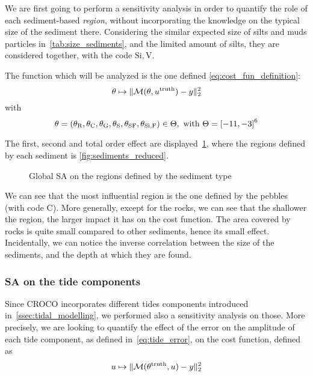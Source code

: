 \documentclass[../../Main_ManuscritThese.tex]{subfiles}
\newcommand{\CROCO}{CROCO}
\newcommand{\zob}{z_b}
\newcommand\imgpath{/home/victor/acadwriting/Manuscrit/Text/Chapter5/img/}
\begin{document}
We are first going to perform a sensitivity analysis in order to
quantify the role of each sediment-based \emph{region}, without
incorporating the knowledge on the typical size of the sediment there.
Considering the similar expected size of silts and muds particles
in~\cref{tab:size_sediments}, and the limited amount of silts, they
are considered together, with the code $\mathrm{Si,V}$.

The function which will be analyzed is the one defined
\cref{eq:cost_fun_definition}:
\begin{equation}
\theta \mapsto \|\mathcal{M}(\theta, u^{\mathrm{truth}}) - y \|_2^2
\end{equation}
with
\begin{equation}
\kk = (\kk_{\mathrm{R}},\kk_{\mathrm{C}},\kk_{\mathrm{G}},\kk_{\mathrm{S}},
\kk_{\mathrm{SF}},\kk_{\mathrm{Si,F}})\in\Kspace, \text{ with }
\Kspace = \interval{-11}{-3}^6%
\end{equation}


The first, second and total order effect are
displayed~\cref{fig:SA_sediments}, where the regions defined by each
sediment is \cref{fig:sediments_reduced}. 

\label{ssec:SA_sediments}
\begin{figure}[ht]
  \centering
  
  \caption{\label{fig:SA_sediments} Global SA on the regions defined by the sediment type}
\end{figure}

We can see that the most influential region is the one defined by the
pebbles (with code C). More generally, except for the rocks, we can
see that the shallower the region, the larger impact it has on the
cost function. The area covered by rocks is quite small compared to
other sediments, hence its small effect. Incidentally, we can notice
the inverse correlation between the size of the sediments, and the
depth at which they are found.


\subsubsection{SA on the tide components}
\label{ssec:SA_tide}

Since \CROCO{} incorporates different tides components introduced
in~\cref{ssec:tidal_modelling}, we performed also a sensitivity
analysis on those. More precisely, we are looking to quantify the
effect of the error on the amplitude of each tide component, as
defined in~\cref{eq:tide_error}, on the cost
function, defined as
\begin{equation}
  u \mapsto  \| \mathcal{M}(\theta^{\mathrm{truth}}, u) - y \|_2^2
\end{equation}
\end{document}
